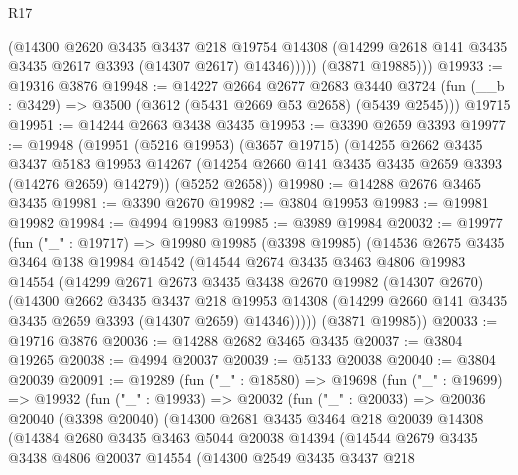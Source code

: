 \begin{lexlean}{R17}
\begin{coremodule}
              (@14300
                @2620
                @3435
                @3437
                @218
                @19754
                @14308
                (@14299 @2618 @141 @3435 @3435 @2617 @3393 (@14307 @2617) @14346)))))
        (@3871 @19885)))
@19933 := @19316 @3876
@19948 := @14227
    @2664
    @2677
    @2683
    @3440
    @3724
    (fun (__b : @3429) => @3500 (@3612 (@5431 @2669 @53 @2658) (@5439 @2545)))
    @19715
@19951 := @14244 @2663 @3438 @3435
@19953 := @3390 @2659 @3393
@19977 := @19948
    (@19951
      (@5216 @19953)
      (@3657 @19715)
      (@14255
        @2662
        @3435
        @3437
        @5183
        @19953
        @14267
        (@14254 @2660 @141 @3435 @3435 @2659 @3393 (@14276 @2659) @14279))
      (@5252 @2658))
@19980 := @14288 @2676 @3465 @3435
@19981 := @3390 @2670
@19982 := @3804 @19953
@19983 := @19981 @19982
@19984 := @4994 @19983
@19985 := @3989 @19984
@20032 := @19977
    (fun ("_" : @19717) =>
    @19980
      @19985
      (@3398 @19985)
      (@14536
        @2675
        @3435
        @3464
        @138
        @19984
        @14542
        (@14544
          @2674
          @3435
          @3463
          @4806
          @19983
          @14554
          (@14299
            @2671
            @2673
            @3435
            @3438
            @2670
            @19982
            (@14307 @2670)
            (@14300
              @2662
              @3435
              @3437
              @218
              @19953
              @14308
              (@14299 @2660 @141 @3435 @3435 @2659 @3393 (@14307 @2659) @14346)))))
      (@3871 @19985))
@20033 := @19716 @3876
@20036 := @14288 @2682 @3465 @3435
@20037 := @3804 @19265
@20038 := @4994 @20037
@20039 := @5133 @20038
@20040 := @3804 @20039
@20091 := @19289
    (fun ("_" : @18580) =>
    @19698
      (fun ("_" : @19699) =>
      @19932
        (fun ("_" : @19933) =>
        @20032
          (fun ("_" : @20033) =>
          @20036
            @20040
            (@3398 @20040)
            (@14300
              @2681
              @3435
              @3464
              @218
              @20039
              @14308
              (@14384
                @2680
                @3435
                @3463
                @5044
                @20038
                @14394
                (@14544
                  @2679
                  @3435
                  @3438
                  @4806
                  @20037
                  @14554
                  (@14300
                    @2549
                    @3435
                    @3437
                    @218

\end{coremodule}
\end{lexlean}
